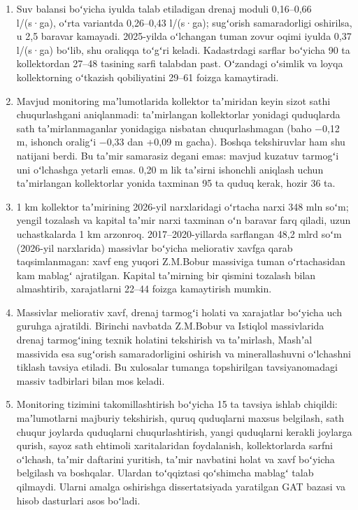 \documentclass[14pt,a4paper,oneside]{extreport}
\begin{document}
\begin{enumerate}
\item
  Suv balansi boʻyicha iyulda talab etiladigan drenaj moduli 0,16--0,66
  l/(s·ga), oʻrta variantda 0,26--0,43 l/(s·ga); sugʻorish samaradorligi
  oshirilsa, u 2,5 baravar kamayadi. 2025-yilda oʻlchangan tuman zovur
  oqimi iyulda 0,37 l/(s·ga) boʻlib, shu oraliqqa toʻgʻri keladi.
  Kadastrdagi sarflar boʻyicha 90 ta kollektordan 27--48 tasining sarfi
  talabdan past. Oʻzandagi oʻsimlik va loyqa kollektorning oʻtkazish
  qobiliyatini 29--61 foizga kamaytiradi.
\item
  Mavjud monitoring maʼlumotlarida kollektor taʼmiridan keyin sizot
  sathi chuqurlashgani aniqlanmadi: taʼmirlangan kollektorlar yonidagi
  quduqlarda sath taʼmirlanmaganlar yonidagiga nisbatan chuqurlashmagan
  (baho −0,12 m, ishonch oraligʻi −0,33 dan +0,09 m gacha). Boshqa
  tekshiruvlar ham shu natijani berdi. Bu taʼmir samarasiz degani emas:
  mavjud kuzatuv tarmogʻi uni oʻlchashga yetarli emas. 0,20 m lik
  taʼsirni ishonchli aniqlash uchun taʼmirlangan kollektorlar yonida
  taxminan 95 ta quduq kerak, hozir 36 ta.
\item
  1 km kollektor taʼmirining 2026-yil narxlaridagi oʻrtacha narxi 348
  mln soʻm; yengil tozalash va kapital taʼmir narxi taxminan oʻn baravar
  farq qiladi, uzun uchastkalarda 1 km arzonroq. 2017--2020-yillarda
  sarflangan 48,2 mlrd soʻm (2026-yil narxlarida) massivlar boʻyicha
  meliorativ xavfga qarab taqsimlanmagan: xavf eng yuqori Z.M.Bobur
  massiviga tuman oʻrtachasidan kam mablagʻ ajratilgan. Kapital
  taʼmirning bir qismini tozalash bilan almashtirib, xarajatlarni 22--44
  foizga kamaytirish mumkin.
\item
  Massivlar meliorativ xavf, drenaj tarmogʻi holati va xarajatlar
  boʻyicha uch guruhga ajratildi. Birinchi navbatda Z.M.Bobur va
  Istiqlol massivlarida drenaj tarmogʻining texnik holatini tekshirish
  va taʼmirlash, Mashʼal massivida esa sugʻorish samaradorligini
  oshirish va minerallashuvni oʻlchashni tiklash tavsiya etiladi. Bu
  xulosalar tumanga topshirilgan tavsiyanomadagi massiv tadbirlari bilan
  mos keladi.
\item
  Monitoring tizimini takomillashtirish boʻyicha 15 ta tavsiya ishlab
  chiqildi: maʼlumotlarni majburiy tekshirish, quruq quduqlarni maxsus
  belgilash, sath chuqur joylarda quduqlarni chuqurlashtirish, yangi
  quduqlarni kerakli joylarga qurish, sayoz sath ehtimoli xaritalaridan
  foydalanish, kollektorlarda sarfni oʻlchash, taʼmir daftarini
  yuritish, taʼmir navbatini holat va xavf boʻyicha belgilash va
  boshqalar. Ulardan toʻqqiztasi qoʻshimcha mablagʻ talab qilmaydi.
  Ularni amalga oshirishga dissertatsiyada yaratilgan GAT bazasi va
  hisob dasturlari asos boʻladi.
\end{enumerate}
\end{document}
